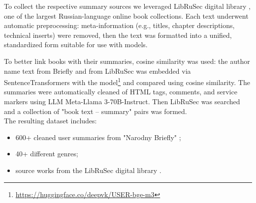 \documentclass{superfri}
\begin{document}
To collect the respective summary sources we leveraged LibRuSec digital library \cite{librusec}, one of the largest Russian-language online book collections.
Each text underwent automatic preprocessing: meta-information (e.g., titles, chapter descriptions, technical inserts) were removed,
then the text was formatted into a unified, standardized form suitable for use with models.

To better link books with their summaries, cosine similarity was used: the author name text from Briefly \cite{Briefly} and from LibRuSec \cite{librusec} was embedded via SentenceTransformers
with the model\footnote{\label{encoder}\url{https://huggingface.co/deepvk/USER-bge-m3}}
and compared using cosine similarity.
The summaries were automatically cleaned of HTML tags, comments, and service markers using LLM Meta-\allowbreak Llama 3-\allowbreak 70B-\allowbreak Instruct.
Then LibRuSec was searched and a collection of "book text – summary" pairs was formed.
\\The resulting dataset includes:
\begin{itemize}
  \item 600+ cleaned user summaries from "Narodny Briefly" \cite{Briefly};
  \item 40+ different genres;
  \item source works from the LibRuSec digital library \cite{librusec}.
\end{itemize}


\end{document}
